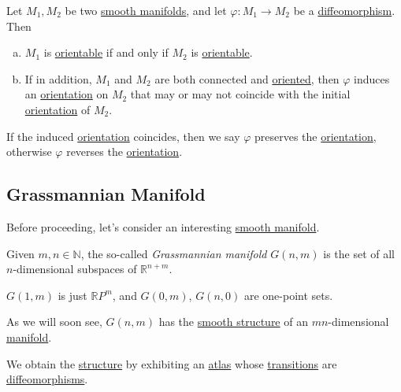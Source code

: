 Let \(M_1, M_2\) be two \hyperref[def:smooth-manifold]{smooth manifolds}, and let \(\varphi \colon M_1 \to M_2\) be a \hyperref[def:diffeomorphism]{diffeomorphism}. Then
\begin{enumerate}[(a)]
	\item \(M_1\) is \hyperref[def:orientable]{orientable} if and only if \(M_2\) is \hyperref[def:orientable]{orientable}.
	\item If in addition, \(M_1\) and \(M_2\) are both connected and \hyperref[def:oriented]{oriented}, then \(\varphi \) induces an \hyperref[def:orientation]{orientation} on \(M_2\) that may or may not coincide with the initial \hyperref[def:orientation]{orientation} of \(M_2\).
\end{enumerate}

If the induced \hyperref[def:orientation]{orientation} coincides, then we say \(\varphi \) preserves the \hyperref[def:orientation]{orientation}, otherwise \(\varphi \) reverses the \hyperref[def:orientation]{orientation}.

\subsection{Grassmannian Manifold}
Before proceeding, let's consider an interesting \hyperref[def:smooth-manifold]{smooth manifold}.

\begin{definition}\label{def:Grassmannian-manifold}
	Given \(m, n\in \mathbb{N} \), the so-called \emph{Grassmannian manifold} \(G(n, m)\) is the set of all \(n\)-dimensional subspaces of \(\mathbb{R} ^{n+m}\).
\end{definition}

\begin{note}
	\(G(1, m)\) is just \(\mathbb{R} P^m\), and \(G(0, m)\), \(G(n, 0)\) are one-point sets.
\end{note}

As we will soon see, \(G(n, m)\) has the \hyperref[def:smooth-structure]{smooth structure} of an \(mn\)-dimensional \hyperref[def:smooth-manifold]{manifold}.

\begin{intuition}
	We obtain the \hyperref[def:smooth-structure]{structure} by exhibiting an \hyperref[def:atlas]{atlas} whose \hyperref[def:coordinate-transition]{transitions} are \hyperref[def:diffeomorphism]{diffeomorphisms}.
\end{intuition}

